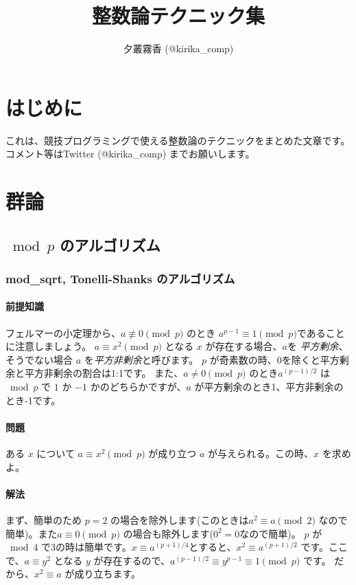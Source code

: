 \documentclass{report}
\author{夕叢霧香 (@kirika\_comp)}
\title{整数論テクニック集}
\begin{document}
\maketitle
\chapter{はじめに}
これは、競技プログラミングで使える整数論のテクニックをまとめた文章です。
コメント等はTwitter (@kirika\_comp) までお願いします。
\chapter{群論}
\section{${}\bmod p$ のアルゴリズム}
\subsection{mod\_sqrt, Tonelli-Shanks のアルゴリズム}
\subsubsection{前提知識}
フェルマーの小定理から、$a \not\equiv 0 \pmod p$ のとき $a^{p-1}\equiv1 \pmod p$であることに注意しましょう。
$a \equiv x^2 \pmod p$ となる $x$ が存在する場合、$a$を \emph{平方剰余}、そうでない場合 $a$ を\emph{平方非剰余}と呼びます。
$p$ が奇素数の時、0を除くと平方剰余と平方非剰余の割合は1:1です。
また、$a\neq0 \pmod p$ のとき$a^{(p-1)/2}$ は ${}\bmod p$ で $1$ か $-1$ かのどちらかですが、$a$ が平方剰余のとき1、平方非剰余のとき-1です。


\subsubsection{問題}
ある $x$ について $a \equiv x^2 \pmod p$ が成り立つ $a$ が与えられる。この時、$x$ を求めよ。

\subsubsection{解法}
まず、簡単のため $p = 2$ の場合を除外します(このときは$a^2 \equiv a \pmod 2$ なので簡単)。また$a \equiv 0 \pmod p$ の場合も除外します($0^2 = 0$なので簡単)。
$p$ が${}\bmod 4$ で3の時は簡単です。$x \equiv a^{(p+1)/4}$とすると、$x^2 \equiv a^{(p+1)/2}$ です。ここで、$a \equiv y^2$ となる $y$ が存在するので、$a^{(p-1)/2}\equiv y^{p-1}\equiv 1 \pmod p$ です。
だから、$x^2 \equiv a$ が成り立ちます。
\end{document}
